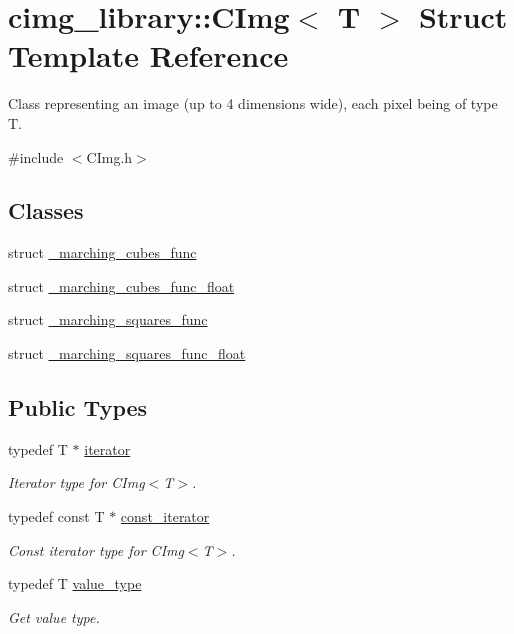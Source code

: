 \hypertarget{structcimg__library_1_1_c_img}{\section{cimg\-\_\-library\-:\-:C\-Img$<$ T $>$ Struct Template Reference}
\label{structcimg__library_1_1_c_img}
}


Class representing an image (up to 4 dimensions wide), each pixel being of type {\ttfamily T}.  




{\ttfamily \#include $<$C\-Img.\-h$>$}

\subsection*{Classes}
\begin{DoxyCompactItemize}
\item 
struct \hyperlink{structcimg__library_1_1_c_img_1_1__marching__cubes__func}{\-\_\-marching\-\_\-cubes\-\_\-func}
\item 
struct \hyperlink{structcimg__library_1_1_c_img_1_1__marching__cubes__func__float}{\-\_\-marching\-\_\-cubes\-\_\-func\-\_\-float}
\item 
struct \hyperlink{structcimg__library_1_1_c_img_1_1__marching__squares__func}{\-\_\-marching\-\_\-squares\-\_\-func}
\item 
struct \hyperlink{structcimg__library_1_1_c_img_1_1__marching__squares__func__float}{\-\_\-marching\-\_\-squares\-\_\-func\-\_\-float}
\end{DoxyCompactItemize}
\subsection*{Public Types}
\begin{DoxyCompactItemize}
\item 
typedef T $\ast$ \hyperlink{structcimg__library_1_1_c_img_a3ff3f07802e67c4ba930427ea45655c8}{iterator}
\begin{DoxyCompactList}\small\item\em Iterator type for C\-Img$<$\-T$>$. \end{DoxyCompactList}\item 
typedef const T $\ast$ \hyperlink{structcimg__library_1_1_c_img_ad444f21017aaa7da6fab45930d3579aa}{const\-\_\-iterator}
\begin{DoxyCompactList}\small\item\em Const iterator type for C\-Img$<$\-T$>$. \end{DoxyCompactList}\item 
\hypertarget{structcimg__library_1_1_c_img_a94119922993ffa72217a158fede82f3b}{typedef T \hyperlink{structcimg__library_1_1_c_img_a94119922993ffa72217a158fede82f3b}{value\-\_\-type}}\label{structcimg__library_1_1_c_img_a94119922993ffa72217a158fede82f3b}

\begin{DoxyCompactList}\small\item\em Get value type. \end{DoxyCompactList}\end{DoxyCompactItemize}
